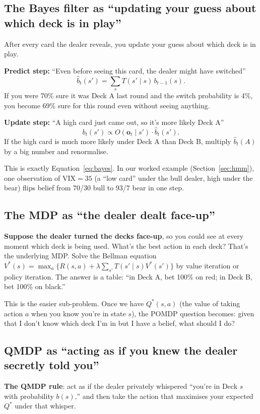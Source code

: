 \documentclass[11pt]{article}
\theoremstyle{plain1}
\theoremstyle{definition1}
\newcommand{\1}{\mathbf{1}}
\begin{document}
\subsection{The Bayes filter as ``updating your guess about which deck is in play''}

After every card the dealer reveals, you update your guess about which deck is in play.

\textbf{Predict step:} ``Even before seeing this card, the dealer might have switched''
\[
\hat b_t(s') = \sum_s T(s'\mid s)\,b_{t-1}(s).
\]
If you were 70\% sure it was Deck A last round and the switch probability is 4\%, you become 69\% sure for this round even without seeing anything.

\textbf{Update step:} ``A high card just came out, so it's more likely Deck A''
\[
b_t(s') \propto O(\mathbf{o}_t \mid s') \cdot \hat b_t(s').
\]
If the high card is much more likely under Deck A than Deck B, multiply $\hat b_t(A)$ by a big number and renormalise.

This is exactly Equation~\ref{eq:bayes}. In our worked example (Section~\ref{sec:hmm}), one observation of VIX$=35$ (a ``low card'' under the bull dealer, high under the bear) flips belief from 70/30 bull to 93/7 bear in one step.

\subsection{The MDP as ``the dealer dealt face-up''}

\textbf{Suppose the dealer turned the decks face-up}, so you could see at every moment which deck is being used. What's the best action in each deck? That's the underlying MDP. Solve the Bellman equation $V^\ast(s) = \max_a\{R(s,a) + \lambda\sum_{s'} T(s'\mid s) V^\ast(s')\}$ by value iteration or policy iteration. The answer is a table: ``in Deck A, bet 100\% on red; in Deck B, bet 100\% on black.''

This is the easier sub-problem. Once we have $Q^\ast(s,a)$ (the value of taking action $a$ when you know you're in state $s$), the POMDP question becomes: given that I don't know which deck I'm in but I have a belief, what should I do?

\subsection{QMDP as ``acting as if you knew the dealer secretly told you''}

\textbf{The QMDP rule}: act as if the dealer privately whispered ``you're in Deck $s$ with probability $b(s)$,'' and then take the action that maximises your expected $Q^\ast$ under that whisper.
\end{document}
